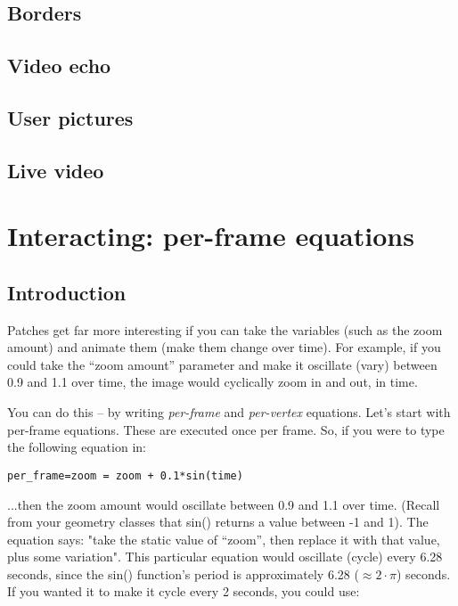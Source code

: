 \documentclass[11pt, a5paper, pagesize]{scrbook}
\begin{document}
\subsection{Borders}

\subsection{Video echo}

\subsection{User pictures}

\subsection{Live video}

\section{Interacting: per-frame equations}
\subsection{Introduction}
Patches get far more interesting if you can take the variables (such as the zoom amount) and animate them (make them change over time). For example, if you could take the ``zoom amount'' parameter and make it oscillate (vary) between 0.9 and 1.1 over time, the image would cyclically zoom in and out, in time.

You can do this -- by writing \textit{per-frame} and \textit{per-vertex} equations. Let's start with per-frame equations. These are executed once per frame. So, if you were to type the following equation in:

\begin{verbatim}
per_frame=zoom = zoom + 0.1*sin(time)
\end{verbatim}


...then the zoom amount would oscillate between 0.9 and 1.1 over time. (Recall from your geometry classes that sin() returns a value between -1 and 1). The equation says: "take the static value of ``zoom'', then replace it with that value, plus some variation". This particular equation would oscillate (cycle) every 6.28 seconds, since the sin() function's period is approximately 6.28 ($\approx 2 \cdot \pi$) seconds. If you wanted it to make it cycle every 2 seconds, you could use:
\end{document}
